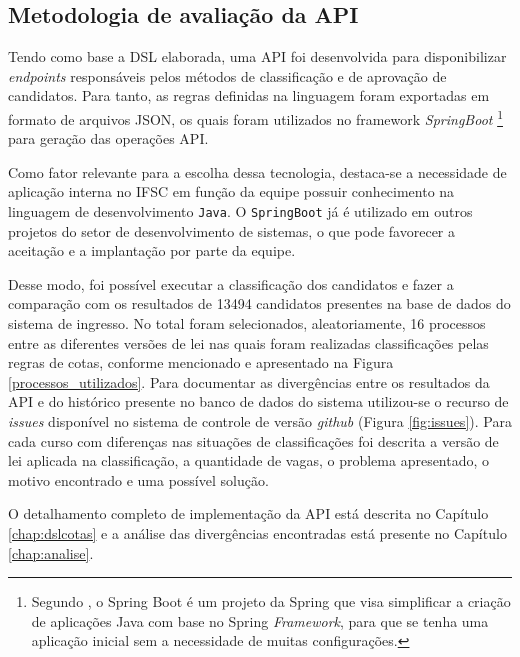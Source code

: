 \subsection{Metodologia de avaliação da API}
\label{metodoapi}
Tendo como base a DSL elaborada, uma \gls{API} foi desenvolvida para disponibilizar \textit{endpoints} responsáveis pelos métodos de classificação e de aprovação de candidatos. Para tanto, as regras definidas na linguagem foram exportadas em formato de arquivos JSON, os quais foram utilizados no framework \textit{SpringBoot} \footnote{Segundo , o Spring Boot é um projeto da Spring que visa simplificar a criação de aplicações Java com base no Spring \textit{Framework}, para que se tenha uma aplicação inicial sem a necessidade de muitas configurações.} para geração das operações \gls{API}. 

Como fator relevante para a escolha dessa tecnologia, destaca-se a necessidade de aplicação interna no \gls{IFSC} em função da equipe possuir conhecimento na linguagem de desenvolvimento \texttt{Java}. O \texttt{SpringBoot} já é utilizado em outros projetos do setor de desenvolvimento de sistemas, o que pode favorecer a aceitação e a implantação por parte da equipe.

Desse modo, foi possível executar a classificação dos candidatos e fazer a comparação com os resultados de 13494 candidatos presentes na base de dados do sistema de ingresso. No total foram selecionados, aleatoriamente, 16 processos entre as diferentes versões de lei nas quais foram realizadas classificações pelas regras de cotas, conforme mencionado e apresentado na Figura \ref{processos_utilizados}. Para documentar as divergências entre os resultados da \gls{API} e do histórico presente no banco de dados do sistema utilizou-se o recurso de \textit{issues} disponível no sistema de controle de versão \textit{github} (Figura \ref{fig:issues}). Para cada curso com diferenças nas situações de classificações foi descrita a versão de lei aplicada na classificação, a quantidade de vagas, o problema apresentado, o motivo encontrado e uma possível solução.



\newpage
O detalhamento completo de implementação da \gls{API} está descrita no Capítulo \ref{chap:dslcotas} e a análise das divergências encontradas está presente no Capítulo \ref{chap:analise}.